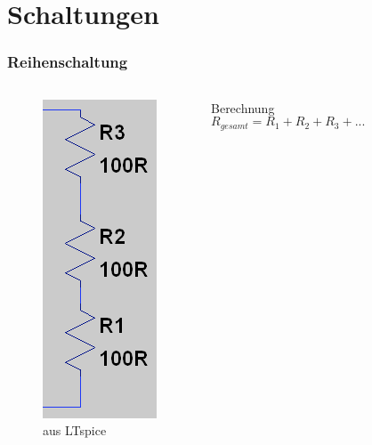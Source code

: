 \section*{Schaltungen}

\begin{frame}
  \frametitle{Reihenschaltung}

  \begin{columns}
    \begin{center}
      \begin{figure}
        \includegraphics[width=.4\textwidth,height=.75\textheight,keepaspectratio]{e04/Reihe.png}
        \caption{aus LTspice}
      \end{figure}
    \end{center}
    \pause
    \begin{block}{Berechnung}
      $$R_{gesamt} = R_1 + R_2 + R_3 + ...$$
    \end{block}
  \end{columns}

\end{frame}

